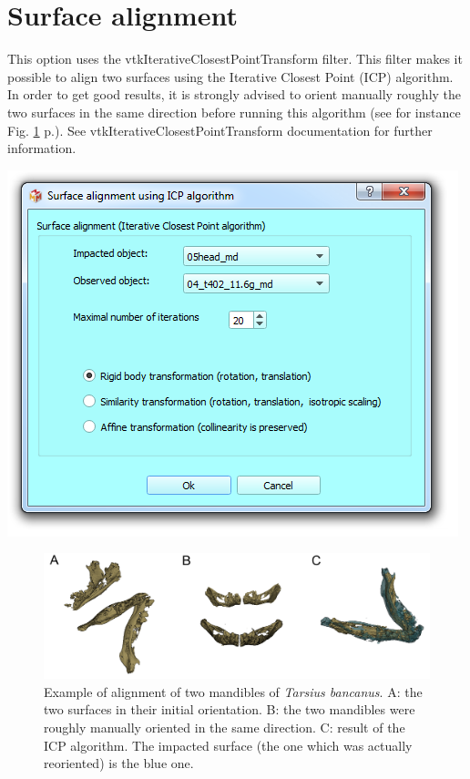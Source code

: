 \section{Surface alignment}\label{surface_alignment_section}
\noindent
\begin{minipage}{0.5\textwidth}
This option uses the vtkIterativeClosestPointTransform filter. This filter makes it possible to align two surfaces using the Iterative Closest Point (ICP) algorithm. In order to get good results, it is strongly advised to orient manually roughly the two surfaces in the same direction before running this algorithm 
(see for instance Fig. \ref{surface_alignment} p.\pageref{surface_alignment}). See vtkIterativeClosestPointTransform documentation for further information.


\end{minipage}    
\begin{minipage}{0.5\textwidth}\centering
  \includegraphics[scale=0.5]{images/09/alignment/surface_alignment_dialog.png}
 \end{minipage} 

\begin{figure}
  \centering
  \includegraphics[scale=0.21]{images/09/alignment/surface_alignment.png} 
	\caption{Example of alignment of two mandibles of \textit{Tarsius bancanus}. A: the two surfaces in their initial orientation. B: the two mandibles were roughly manually oriented in the same direction. C: result of the ICP algorithm. The impacted surface (the one which was actually reoriented) is the blue one. }
 \label{surface_alignment}
\end{figure}



